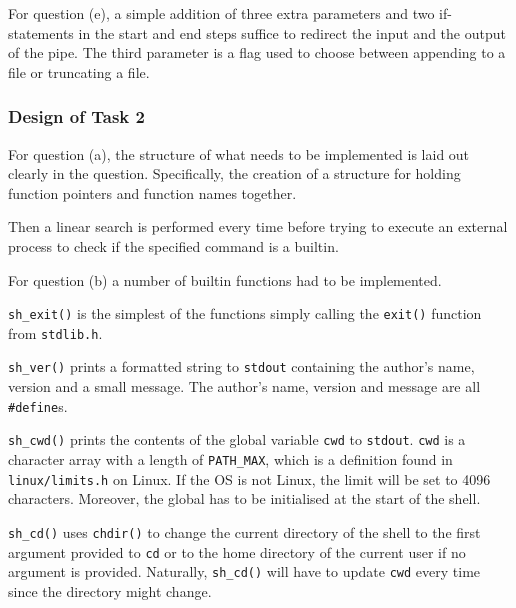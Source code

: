 \documentclass[12pt]{article}
\begin{document}




For question (e), a simple addition of three extra parameters and
two if-statements in the start and end steps suffice to redirect
the input and the output of the pipe. The third parameter is a
flag used to choose between appending to a file or truncating a
file.

\subsubsection{Design of Task 2}

For question (a), the structure of what needs to be implemented is
laid out clearly in the question. Specifically, the creation of
a structure for holding function pointers and function names
together. 

Then a linear search is performed every time before trying to
execute an external process to check if the specified command is
a builtin.

For question (b) a number of builtin functions had to be
implemented.

\texttt{sh\_exit()} is the simplest of the functions simply
calling the \texttt{exit()} function from \texttt{stdlib.h}.

\texttt{sh\_ver()} prints a formatted string to \texttt{stdout}
containing the author's name, version and a small message. The
author's name, version and message are all \texttt{\#define}s.





\texttt{sh\_cwd()} prints the contents of the global variable
\texttt{cwd} to \texttt{stdout}. \texttt{cwd} is a character
array with a length of \texttt{PATH\_MAX}, which is a definition
found in \texttt{linux/limits.h} on Linux. If the OS is not
Linux, the limit will be set to 4096 characters. Moreover, the
global has to be initialised at the start of the shell.

\texttt{sh\_cd()} uses \texttt{chdir()} to change the current
directory of the shell to the first argument provided to
\texttt{cd} or to the home directory of the current user if no
argument is provided. Naturally, \texttt{sh\_cd()} will have to
update \texttt{cwd} every time since the directory might change.
\end{document}

